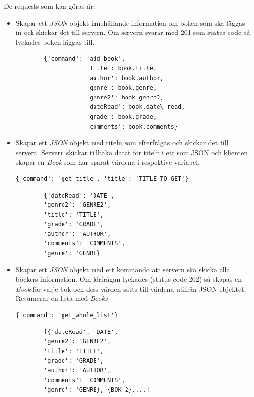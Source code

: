 \documentclass[11pt, titlepage, oneside, a4paper]{article}
\begin{document}
        De requests som kan göras är:
        \begin{itemize}
		\item[add\_book:] Skapar ett \emph{JSON} objekt innehållande information om boken som ska läggas in och skickar det till servern. Om servern svarar med 201 som status code så lyckades boken läggas till.
        \begin{verbatim}
        {'command': 'add_book',
        	        'title': book.title,
                    'author': book.author,
                    'genre': book.genre,
                    'genre2': book.genre2,
                    'dateRead': book.date\_read,
                    'grade': book.grade,
                    'comments': book.comments}
        \end{verbatim}
        
        \item[get\_title:]  Skapar ett \emph{JSON} objekt med titeln som efterfrågas och skickar det till servern. Servern skickar tillbaka datat för titeln i ett som JSON och klienten skapar en \emph{Book} som har sparat värdena i respektive variabel.
        \begin{verbatim}{'command': 'get_title', 'title': 'TITLE_TO_GET'}\end{verbatim}
		
        \begin{verbatim}
        {'dateRead': 'DATE',
        'genre2': 'GENRE2',
        'title': 'TITLE',
        'grade': 'GRADE',
        'author': 'AUTHOR',
        'comments': 'COMMENTS',
        'genre': 'GENRE}
        \end{verbatim}
        
        \item[get\_all\_books:] Skapar ett \emph{JSON} objekt med ett kommando att servern ska skicka alla böckers information. Om förfrågan lyckades (status code 202) så skapas en \emph{Book} för varje bok och dess värden sätts till värdena utifrån JSON objektet. Returnerar en lista med \emph{Books} 
        \begin{verbatim}{'command': 'get_whole_list'}\end{verbatim}
		
        \begin{verbatim}
        [{'dateRead': 'DATE',
        'genre2': 'GENRE2',
        'title': 'TITLE',
        'grade': 'GRADE',
        'author': 'AUTHOR',
        'comments': 'COMMENTS',
        'genre': 'GENRE}, {BOK_2}....]
        \end{verbatim}
        

\end{itemize}
\end{document}
